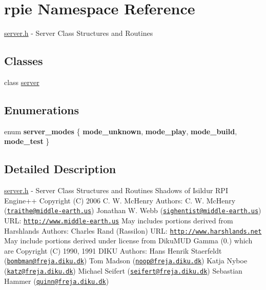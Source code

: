 \hypertarget{namespacerpie}{\section{rpie Namespace Reference}
\label{namespacerpie}
}


\hyperlink{server_8h_source}{server.\-h} -\/ Server Class Structures and Routines  


\subsection*{Classes}
\begin{DoxyCompactItemize}
\item 
class \hyperlink{classrpie_1_1server}{server}
\end{DoxyCompactItemize}
\subsection*{Enumerations}
\begin{DoxyCompactItemize}
\item 
enum {\bfseries server\-\_\-modes} \{ {\bfseries mode\-\_\-unknown}, 
{\bfseries mode\-\_\-play}, 
{\bfseries mode\-\_\-build}, 
{\bfseries mode\-\_\-test}
 \}
\end{DoxyCompactItemize}


\subsection{Detailed Description}
\hyperlink{server_8h_source}{server.\-h} -\/ Server Class Structures and Routines Shadows of Isildur R\-P\-I Engine++ Copyright (C) 2006 C. W. Mc\-Henry Authors\-: C. W. Mc\-Henry (\href{mailto:traithe@middle-earth.us}{\tt traithe@middle-\/earth.\-us}) Jonathan W. Webb (\href{mailto:sighentist@middle-earth.us}{\tt sighentist@middle-\/earth.\-us}) U\-R\-L\-: \href{http://www.middle-earth.us}{\tt http\-://www.\-middle-\/earth.\-us} May includes portions derived from Harshlands Authors\-: Charles Rand (Rassilon) U\-R\-L\-: \href{http://www.harshlands.net}{\tt http\-://www.\-harshlands.\-net} May include portions derived under license from Diku\-M\-U\-D Gamma (0.) which are Copyright (C) 1990, 1991 D\-I\-K\-U Authors\-: Hans Henrik Staerfeldt (\href{mailto:bombman@freja.diku.dk}{\tt bombman@freja.\-diku.\-dk}) Tom Madson (\href{mailto:noop@freja.diku.dk}{\tt noop@freja.\-diku.\-dk}) Katja Nyboe (\href{mailto:katz@freja.diku.dk}{\tt katz@freja.\-diku.\-dk}) Michael Seifert (\href{mailto:seifert@freja.diku.dk}{\tt seifert@freja.\-diku.\-dk}) Sebastian Hammer (\href{mailto:quinn@freja.diku.dk}{\tt quinn@freja.\-diku.\-dk}) 